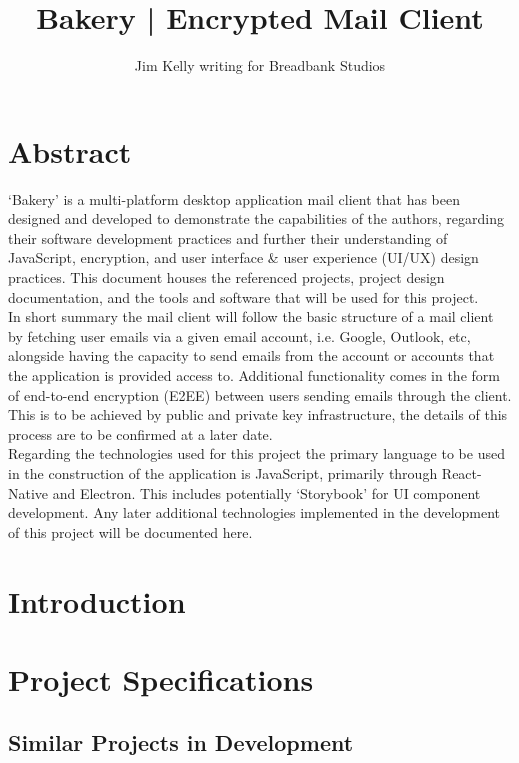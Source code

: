 \documentclass[12pt]{article}
\title{Bakery | Encrypted Mail Client}
\author{Jim Kelly writing for Breadbank Studios}
\begin{document}
\maketitle
\vspace{40pt}
\section*{Abstract}
	\noindent `Bakery' is a multi-platform desktop application mail client that has been designed and developed to demonstrate the capabilities of the authors, regarding their software development practices and further their understanding of JavaScript, encryption, and user interface \& user experience (UI/UX) design practices. This document houses the referenced projects, project design documentation, and the tools and software that will be used for this project.\\
	\newline
	\noindent In short summary the mail client will follow the basic structure of a mail client by fetching user emails via a given email account, i.e. Google, Outlook, etc, alongside having the capacity to send emails from the account or accounts that the application is provided access to. Additional functionality comes in the form of end-to-end encryption (E2EE) between users sending emails through the client. This is to be achieved by public and private key infrastructure, the details of this process are to be confirmed at a later date.\\
	\newline
	\noindent Regarding the technologies used for this project the primary language to be used in the construction of the application is JavaScript, primarily through React-Native and Electron. This includes potentially `Storybook'\cite{storybooks} for UI component development. Any later additional technologies implemented in the development of this project will be documented here.
\pagebreak
\tableofcontents
\pagebreak
	\section{Introduction}
\lipsum[1]
\section{Project Specifications}
	\subsection{Similar Projects in Development}
		\lipsum[1]
\end{document}
